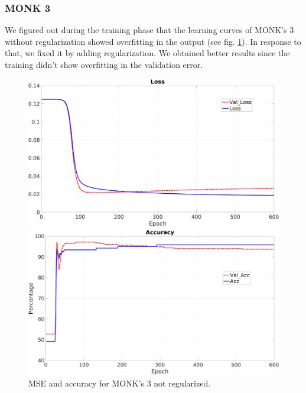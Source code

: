 \subsubsection{MONK 3}
We figured out during the training phase that the learning curves of MONK's 3 without regularization showed overfitting in the output (see fig. \ref{fig:m3nr}). In response to that, we fixed it by adding regularization. We obtained better results since the training didn't show overfitting in the validation error.
\begin{figure}[H]
    \centering
    \begin{minipage}[t]{0.5\linewidth}
        \includegraphics[width=\linewidth]{img/Monk3_loss_noReg.png}

    \end{minipage}%
    \begin{minipage}[t]{0.5\linewidth}
        \includegraphics[width=\linewidth]{img/Monk3_accuracy_noReg.png}
    \end{minipage}
    \caption{MSE and accuracy for MONK’s 3 not regularized.}
    \label{fig:m3nr}
\end{figure}

